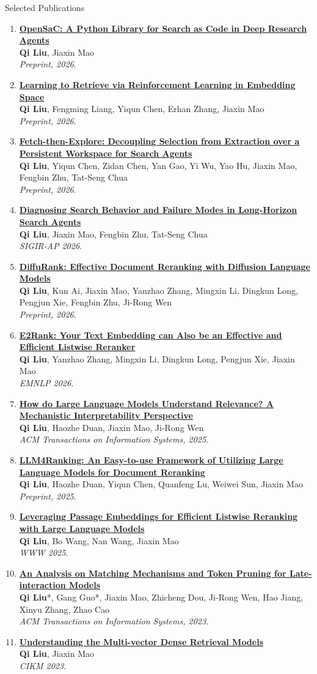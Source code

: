 \documentclass{resume}
\newcommand{\pubentry}[5]{\item\label{pub:#1} \href{#2}{\textbf{#3}}\\[-1pt]{\small #4}\\[-1pt]{\small\emph{#5}.}}
\begin{document}
\newpage
\begin{rSection}{Selected Publications}
{\sloppy
\begin{enumerate}
\pubentry{p09}{https://github.com/liuqi6777/OpenSaC}{OpenSaC: A Python Library for Search as Code in Deep Research Agents}{\textbf{Qi Liu}, Jiaxin Mao}{Preprint, 2026}
\pubentry{p01}{https://arxiv.org/abs/2610.07731}{Learning to Retrieve via Reinforcement Learning in Embedding Space}{\textbf{Qi Liu}, Fengming Liang, Yiqun Chen, Erhan Zhang, Jiaxin Mao}{Preprint, 2026}
\pubentry{p10}{https://arxiv.org/pdf/2608.02097}{Fetch-then-Explore: Decoupling Selection from Extraction over a Persistent Workspace for Search Agents}{\textbf{Qi Liu}, Yiqun Chen, Zidan Chen, Yan Gao, Yi Wu, Yao Hu, Jiaxin Mao, Fengbin Zhu, Tat-Seng Chua}{Preprint, 2026}
\pubentry{p11}{https://arxiv.org/pdf/2608.01913}{Diagnosing Search Behavior and Failure Modes in Long-Horizon Search Agents}{\textbf{Qi Liu}, Jiaxin Mao, Fengbin Zhu, Tat-Seng Chua}{SIGIR-AP 2026}
\pubentry{p02}{http://arxiv.org/pdf/2602.12528}{DiffuRank: Effective Document Reranking with Diffusion Language Models}{\textbf{Qi Liu}, Kun Ai, Jiaxin Mao, Yanzhao Zhang, Mingxin Li, Dingkun Long, Pengjun Xie, Fengbin Zhu, Ji-Rong Wen}{Preprint, 2026}
\pubentry{p03}{https://arxiv.org/pdf/2510.22733v2}{E2Rank: Your Text Embedding can Also be an Effective and Efficient Listwise Reranker}{\textbf{Qi Liu}, Yanzhao Zhang, Mingxin Li, Dingkun Long, Pengjun Xie, Jiaxin Mao}{EMNLP 2026}
\pubentry{p04}{https://arxiv.org/pdf/2504.07898}{How do Large Language Models Understand Relevance? A Mechanistic Interpretability Perspective}{\textbf{Qi Liu}, Haozhe Duan, Jiaxin Mao, Ji-Rong Wen}{ACM Transactions on Information Systems, 2025}
\pubentry{p05}{https://arxiv.org/pdf/2504.07439}{LLM4Ranking: An Easy-to-use Framework of Utilizing Large Language Models for Document Reranking}{\textbf{Qi Liu}, Haozhe Duan, Yiqun Chen, Quanfeng Lu, Weiwei Sun, Jiaxin Mao}{Preprint, 2025}
\pubentry{p06}{https://arxiv.org/pdf/2406.14848}{Leveraging Passage Embeddings for Efficient Listwise Reranking with Large Language Models}{\textbf{Qi Liu}, Bo Wang, Nan Wang, Jiaxin Mao}{WWW 2025}
\pubentry{p07}{https://dl.acm.org/doi/epdf/10.1145/3639818}{An Analysis on Matching Mechanisms and Token Pruning for Late-interaction Models}{\textbf{Qi Liu}*, Gang Guo*, Jiaxin Mao, Zhicheng Dou, Ji-Rong Wen, Hao Jiang, Xinyu Zhang, Zhao Cao}{ACM Transactions on Information Systems, 2023}
\pubentry{p08}{https://dl.acm.org/doi/epdf/10.1145/3583780.3615282}{Understanding the Multi-vector Dense Retrieval Models}{\textbf{Qi Liu}, Jiaxin Mao}{CIKM 2023}
\end{enumerate}
}
\end{rSection}
\end{document}
